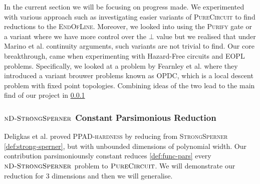 In the current section we will be focusing on progress made.
We experimented with various approach
such as investigating easier variants of \textsc{PureCircuit} to find reductions
to the \textsc{EndOfLine}. Moreover, we looked into using the \textsc{Purify} gate
or a variant where we have more control over the $\bot$ value but we
realised that under Marino et al. \cite{marino_GeneralTheoryMetastable_1981} continuity
arguments, such variants are not trivial to find.
Our core breakthrough, came when experimenting with
Hazard-Free circuits  and \textsc{EOPL} problems. Specifically,
we looked at a problem by Fearnley et al. \cite{fearnley_UniqueEndPotential_2020} where
they introduced a variant brouwer problems known as \textsc{OPDC}, which is a 
local descent problem with fixed point topologies. Combining ideas of the two 
lead to the main find of our project in \ref{sect:main-result}






\subsubsection{$\textnormal{\textsc{nD-StrongSperner}}$ Constant Parsimonious Reduction} \label{sect:main-result}

Deligkas et al. \cite{deligkas_PureCircuitTightInapproximability_2024} proved
\textsc{PPAD-hardness} by reducing from \textsc{StrongSperner} \ref{def:strong-sperner},
but with unbounded dimensions of polynomial width.
Our contribution parsimoniounsly constant reduces \ref{def:func-pars}
every $\textnormal{\textsc{nD-StrongSperner}}$ problem to  $\textnormal{\textsc{PureCircuit}}$. 
We will demonstrate our reduction for 3 dimensions and then we will generalise.

